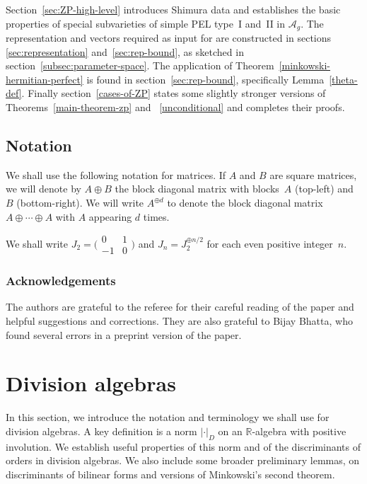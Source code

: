 \documentclass[JEP,XML,SOM,Unicode,NoFloatCountersInSection]{cedram}
\newcommand{\bR}{\mathbb{R}}
\newcommand{\Ag}{\mathcal{A}_g}
\newcommand{\abs}[1]{\lvert #1 \rvert}
\newcommand{\fullsmallmatrix}[4]{\bigl( \begin{smallmatrix} #1 & #2 \\ #3 & #4 \end{smallmatrix} \bigr)}
\begin{document}
Section~\ref{sec:ZP-high-level} introduces Shimura data and establishes the basic properties of special subvarieties of simple PEL type~I and~II in $\Ag$.
The representation and vectors \hbox{required} as input for \cite[Th.\,1.2]{QRTUI} are constructed in sections \ref{sec:representation} and~\ref{sec:rep-bound}, as sketched in section~\ref{subsec:parameter-space}. The application of Theorem~\ref{minkowski-hermitian-perfect} is found in section~\ref{sec:rep-bound}, specifically Lemma~\ref{theta-def}. Finally section~\ref{cases-of-ZP} states some slightly stronger versions of Theorems~\ref{main-theorem-zp} and~ \ref{unconditional} and completes their proofs.

\subsection{Notation} \label{subsec:notation}

We shall use the following notation for matrices.
If $A$ and $B$ are square matrices, we will denote by $A\oplus B$ the block diagonal matrix with blocks~$A$ (top-left) and $B$ (bottom-right). We will write $A^{\oplus d}$ to denote the block diagonal matrix $A\oplus\cdots\oplus A$ with $A$ appearing $d$ times.

We shall write $J_2 = \fullsmallmatrix{0}{1}{-1}{0}$ and $J_n = J_2^{\oplus n/2}$ for each even positive integer~$n$.

\subsubsection*{Acknowledgements}
The authors are grateful to the referee for their careful reading of the paper and helpful suggestions and corrections.
They are also grateful to Bijay Bhatta, who found several errors in a preprint version of the paper.

\section{Division algebras}
\label{sec:division-algebras}

In this section, we introduce the notation and terminology we shall use for division algebras. A key definition is a norm $\abs{\cdot}_D$ on an $\bR$-algebra with positive involution. We establish useful properties of this norm and of the discriminants of orders in division algebras.
We also include some broader preliminary lemmas, on discriminants of bilinear forms and versions of Minkowski's second theorem.
\end{document}
